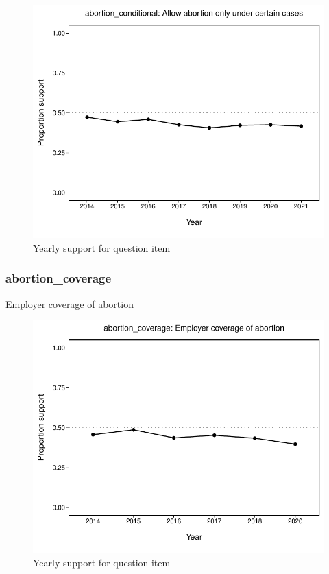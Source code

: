 \documentclass[
  12pt]{article}
\begin{document}
\begin{figure}

{\centering \includegraphics{error-checking_files/figure-latex/unnamed-chunk-3-3} 

}

\caption{Yearly support for question item}\label{fig:unnamed-chunk-3-3}
\end{figure}

\hypertarget{abortion_coverage}{%
\subsubsection{abortion\_coverage}\label{abortion_coverage}}

Employer coverage of abortion

\begin{figure}

{\centering \includegraphics{error-checking_files/figure-latex/unnamed-chunk-3-4} 

}

\caption{Yearly support for question item}\label{fig:unnamed-chunk-3-4}
\end{figure}
\end{document}

